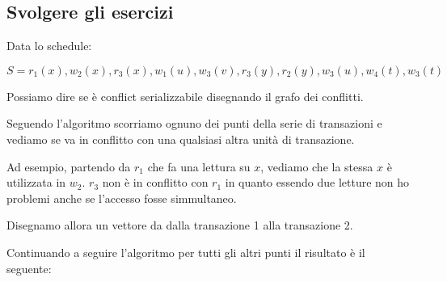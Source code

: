 \subsection{Svolgere gli esercizi}

\begin{exmp}
    Data lo schedule:

    \[S = r_1(x), w_2(x), r_3(x), w_1(u), w_3(v), r_3(y), r_2(y), w_3(u), w_4(t), w_3(t)\]

    Possiamo dire se è conflict serializzabile disegnando il grafo dei conflitti.

    Seguendo l'algoritmo scorriamo ognuno dei punti della serie di transazioni e vediamo se va in conflitto con una qualsiasi altra unità di transazione.

    Ad esempio, partendo da \textbf{$r_1$} che fa una lettura su \textbf{$x$}, vediamo che la stessa \textbf{$x$} è utilizzata in \textbf{$w_2$}. \textbf{$r_3$} non è in conflitto con \textbf{$r_1$} in quanto essendo due letture non ho problemi anche se l'accesso fosse simmultaneo.

    Disegnamo allora un vettore da dalla transazione 1 alla transazione 2.
    \begin{center}
    \end{center}

    Continuando a seguire l'algoritmo per tutti gli altri punti il risultato è il seguente:
    \begin{center}
    \end{center}


\end{exmp}
